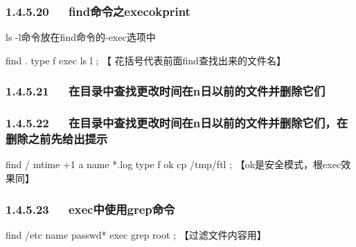 \documentclass[letterpaper,12pt,english]{sphinxmanual}
\begin{document}
\subsubsection{1.4.5.20   find命令之execokprint}
\label{\detokenize{001software/001install/linux:findexecokprint}}
ls -l命令放在find命令的-exec选项中

\begin{sphinxVerbatim}[commandchars=\\\{\}]
find . \PYGZhy{}type f \PYGZhy{}exec ls \PYGZhy{}l \PYGZob{}\PYGZcb{} \PYGZbs{}; 【\PYGZob{}\PYGZcb{}   花括号代表前面find查找出来的文件名】
\end{sphinxVerbatim}


\subsubsection{1.4.5.21   在目录中查找更改时间在n日以前的文件并删除它们}
\label{\detokenize{001software/001install/linux:n}}
\begin{sphinxVerbatim}[commandchars=\\\{\}]
       \PYGZbs{}
\end{sphinxVerbatim}


\subsubsection{1.4.5.22   在目录中查找更改时间在n日以前的文件并删除它们，在删除之前先给出提示}
\label{\detokenize{001software/001install/linux:id19}}
\begin{sphinxVerbatim}[commandchars=\\\{\}]
find / \PYGZhy{}mtime +1 \PYGZhy{}a \PYGZhy{}name \PYGZdq{}*.log\PYGZdq{} \PYGZhy{}type f \PYGZhy{}ok cp \PYGZob{}\PYGZcb{} /tmp/ftl \PYGZbs{}; 【\PYGZhy{}ok是安全模式，根exec效果同】
\end{sphinxVerbatim}


\subsubsection{1.4.5.23   exec中使用grep命令}
\label{\detokenize{001software/001install/linux:execgrep}}
\begin{sphinxVerbatim}[commandchars=\\\{\}]
find /etc \PYGZhy{}name \PYGZdq{}passwd*\PYGZdq{} \PYGZhy{}exec grep \PYGZdq{}root\PYGZdq{} \PYGZob{}\PYGZcb{} \PYGZbs{}; 【过滤文件内容用】
\end{sphinxVerbatim}
\end{document}
